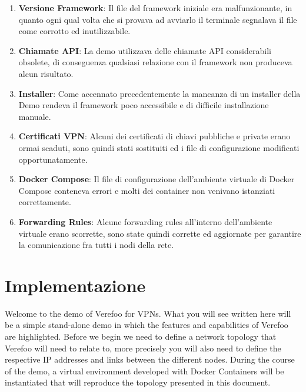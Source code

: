 \begin{enumerate}
    \item \textbf{Versione Framework}: Il file del framework iniziale era malfunzionante, in quanto ogni qual volta che si provava ad avviarlo il terminale segnalava il file come corrotto ed inutilizzabile.
    \item \textbf{Chiamate API}: La demo utilizzava delle chiamate API considerabili obsolete, di conseguenza qualsiasi relazione con il framework non produceva alcun risultato.
    \item \textbf{Installer}: Come accennato precedentemente la mancanza di un installer della Demo rendeva il framework poco accessibile e di difficile installazione manuale.
    \item \textbf{Certificati VPN}: Alcuni dei certificati di chiavi pubbliche e private erano ormai scaduti, sono quindi stati sostituiti ed i file di configurazione modificati opportunatamente.
    \item \textbf{Docker Compose}: Il file di configurazione dell'ambiente virtuale di Docker Compose conteneva errori e molti dei container non venivano istanziati correttamente.
    \item \textbf{Forwarding Rules}: Alcune forwarding rules all'interno dell'ambiente virtuale erano scorrette, sono state quindi corrette ed aggiornate per garantire la comunicazione fra tutti i nodi della rete.
\end{enumerate}

    
\section{Implementazione}
Welcome to the demo of Verefoo for VPNs. What you will see written here will be a simple stand-alone demo in which the features and capabilities of Verefoo are highlighted.
Before we begin we need to define a network topology that Verefoo will need to relate to, more precisely you will also need to define the respective IP addresses and links between the different nodes.  During the course of the demo, a virtual environment developed with Docker Containers will be instantiated that will reproduce the topology presented in this document.

